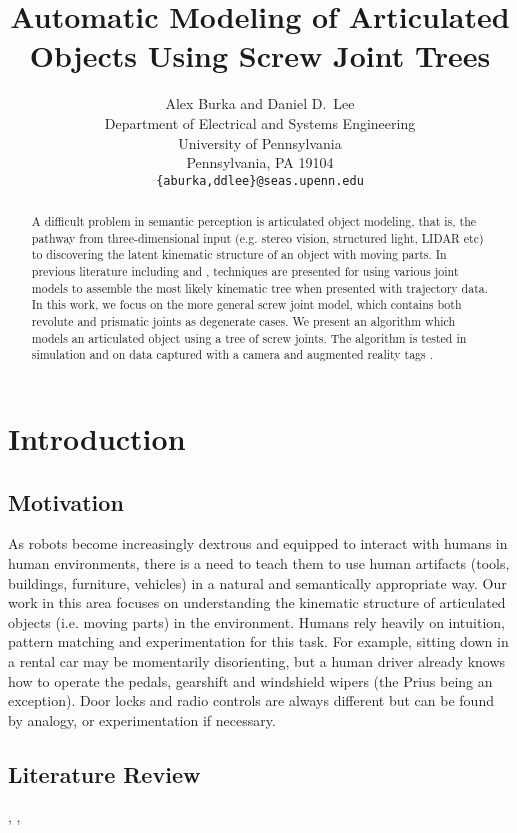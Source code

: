 \documentclass{article} %
\title{Automatic Modeling of Articulated Objects Using Screw Joint Trees}
\author{
Alex Burka and Daniel D.~Lee \\
Department of Electrical and Systems Engineering\\
University of Pennsylvania\\
Pennsylvania, PA 19104 \\
\texttt{\{aburka,ddlee\}@seas.upenn.edu} \\
}
\begin{document}
\maketitle

\begin{abstract}
  A difficult problem in semantic perception is articulated object modeling, that is, the pathway from three-dimensional input (e.g. stereo vision, structured light, LIDAR etc) to discovering the latent kinematic structure of an object with moving parts. In previous literature including \cite{Burka2013} and \cite{Sturm2009}, techniques are presented for using various joint models to assemble the most likely kinematic tree when presented with trajectory data. In this work, we focus on the more general screw joint model, which contains both revolute and prismatic joints as degenerate cases. We present an algorithm which models an articulated object using a tree of screw joints. The algorithm is tested in simulation and on data captured with a camera and augmented reality tags \cite{aruco}.
\end{abstract}

\section{Introduction}

\subsection{Motivation}
As robots become increasingly dextrous and equipped to interact with humans in human environments, there is a need to teach them to use human artifacts (tools, buildings, furniture, vehicles) in a natural and semantically appropriate way. Our work in this area focuses on understanding the kinematic structure of articulated objects (i.e. moving parts) in the environment. Humans rely heavily on intuition, pattern matching and experimentation for this task. For example, sitting down in a rental car may be momentarily disorienting, but a human driver already knows how to operate the pedals, gearshift and windshield wipers (the Prius being an exception). Door locks and radio controls are always different but can be found by analogy, or experimentation if necessary.

\subsection{Literature Review}
\cite{Sturm2009}, \cite{Aqvist1986}, \cite{Burka2013}
\end{document}
